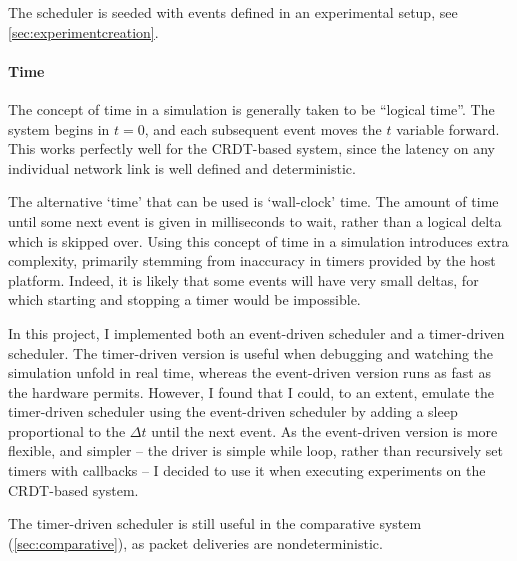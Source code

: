 \documentclass[12pt,a4paper,twoside,openright]{report}
\begin{document}
		The scheduler is seeded with events defined in an experimental setup, see \cref{sec:experimentcreation}.
		
		\paragraph{Time} \label{sec:rtscheduler}
		The concept of time in a simulation is generally taken to be ``logical time''. The system begins in $t = 0$, and each subsequent event moves the $t$ variable forward. This works perfectly well for the CRDT-based system, since the latency on any individual network link is well defined and deterministic.
		
		The alternative `time' that can be used is `wall-clock' time. The amount of time until some next event is given in milliseconds to wait, rather than a logical delta which is skipped over. Using this concept of time in a simulation introduces extra complexity, primarily stemming from inaccuracy in timers provided by the host platform. Indeed, it is likely that some events will have very small deltas, for which starting and stopping a timer would be impossible. 
		
		In this project, I implemented both an event-driven scheduler and a timer-driven scheduler. The timer-driven version is useful when debugging and watching the simulation unfold in real time, whereas the event-driven version runs as fast as the hardware permits. However, I found that I could, to an extent, emulate the timer-driven scheduler using the event-driven scheduler by adding a sleep proportional to the $\Delta t$ until the next event. As the event-driven version is more flexible, and simpler -- the driver is simple while loop, rather than recursively set timers with callbacks -- I decided to use it when executing experiments on the CRDT-based system.
		
		The timer-driven scheduler is still useful in the comparative system (\cref{sec:comparative}), as packet deliveries are nondeterministic.
		
\end{document}
